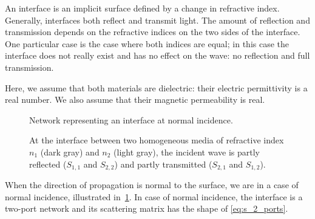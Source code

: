 An interface is an implicit surface defined by a change in refractive index.
Generally, interfaces both reflect and transmit light.
The amount of reflection and transmission depends on the refractive indices on the two sides of the interface.
One particular case is the case where both indices are equal; in this case the interface does not really exist and has no effect on the wave: no reflection and full transmission.

Here, we assume that both materials are dielectric: their electric permittivity is a real number.
We also assume that their magnetic permeability is real.

\begin{figure}[hbtp]
    \centering
    
    \caption{Network representing an interface at normal incidence.}
    \caption*{
        At the interface between two homogeneous media of refractive index
        $n_1$ (dark gray) and $n_2$ (light gray),
        the incident wave is partly reflected ($S_{1,1}$ and $S_{2,2}$)
        and partly transmitted ($S_{2,1}$ and $S_{1,2}$).
    }
    \label{fig:net_interface_normal}
\end{figure}

When the direction of propagation is normal to the surface, we are in a case of normal incidence, illustrated in~\cref{fig:net_interface_normal}.
In case of normal incidence, the interface is a two-port network and its scattering matrix has the shape of \cref{eq:s_2_ports}.

